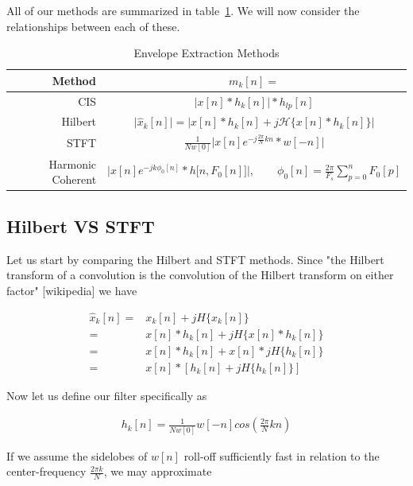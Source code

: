 \documentclass [11pt, proquest,oneside] {uwthesis}[2015/03/03]
\begin{document}
All of our methods are summarized in table~\ref{table:envelope_extraction_methods}.  We will now consider the relationships between each of these.

\begin{table}
\begin{center}
\begin{tabular}{| r | c |}
  \hline
  \textbf{Method} & $m_k[n] = $ \\ \hline
  CIS & $\Big| x[n] * h_k[n] \Big| * h_{lp}[n]$ \\ \hline
  Hilbert & $\Big| \widehat{x}_k[n] \Big| = \Big| x[n] * h_k[n] + j\mathcal{H}\{x[n] * h_k[n]\} \Big|$ \\ \hline
  STFT & $\frac{1}{Nw[0]}  \Big\vert x[n] e^{-j\frac{2\pi}{N}kn} * w[-n] \Big\vert$ \\ \hline
  Harmonic Coherent & $\Big| x[n] e^{-jk\phi_0 [n]} * h\big[n, F_0[n] \big] \Big|, \qquad \phi_0[n] = \frac{2\pi}{F_s} \sum_{p=0}^{n} F_0[p]$ \\ \hline
\end{tabular}
\end{center}
\caption{Envelope Extraction Methods}\label{table:envelope_extraction_methods}
\end{table}

\subsection{Hilbert VS STFT}

Let us start by comparing the Hilbert and STFT methods.  Since "the Hilbert transform of a convolution is the convolution of the Hilbert transform on either factor" [wikipedia] we have 

\begin{align}
\label{eq:x_analytic}
\widehat{x}_k[n] =& x_k[n] + jH\{x_k[n]\} \nonumber \\
=& x[n] * h_k[n] + jH\{x[n] * h_k[n]\} \nonumber \\
=& x[n] * h_k[n] + x[n] * jH\{h_k[n]\} \nonumber \\
=& x[n] * [h_k[n]+  jH\{h_k[n]\}]
\end{align}

Now let us define our filter specifically as

\begin{align}
\label{eq:hilbert_constrained_filter}
h_k[n] = \frac{1}{Nw[0]}w[-n]cos(\frac{2\pi}{N}kn)
\end{align}

If we assume the sidelobes of $w[n]$ roll-off sufficiently fast in relation to the center-frequency $\frac{2\pi k}{N}$, we may approximate
\end{document}

